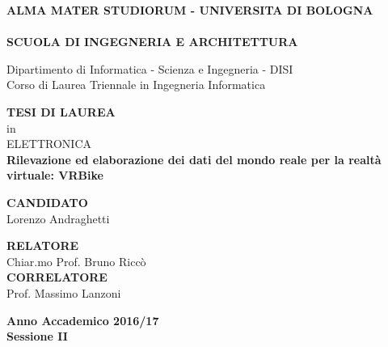 \thispagestyle{empty}
\begin{titlepage}


\vspace*{-1.5cm}
\begin{center}
  \large
  \textbf{ALMA MATER STUDIORUM - UNIVERSITA DI BOLOGNA}\\
  
  \hrulefill\\
  
  \textbf{SCUOLA DI INGEGNERIA  E ARCHITETTURA}\\
  \vspace*{.75cm}
  
  
  Dipartimento di Informatica - Scienza e Ingegneria - DISI\\
  Corso di Laurea Triennale in Ingegneria Informatica\\
  
  \vspace*{1.2cm}
  
  
  \textbf{TESI DI LAUREA}\\
  \vspace*{.4cm}
  in\\
  \vspace*{.4cm}
  ELETTRONICA\\

  \vspace*{2cm} \LARGE
  \textbf{Rilevazione ed elaborazione dei dati del mondo reale per la realtà virtuale: VRBike}\\
 \end{center}
 
 \vspace*{3cm}
 
 \begin{flushleft}
  \textbf{CANDIDATO}\\ Lorenzo Andraghetti \\
\end{flushleft}

\vspace*{-2cm}

 \begin{flushright}
  \textbf{RELATORE}\\ Chiar.mo Prof. Bruno Riccò \\
  \vspace*{1.5cm}
  \textbf{CORRELATORE}\\ Prof. Massimo Lanzoni
 \end{flushright}

   



\vspace*{2cm}

\begin{center}
	\textbf{
  Anno Accademico 2016/17\\
  Sessione II
  }
\end{center} 
\clearpage
\end{titlepage}